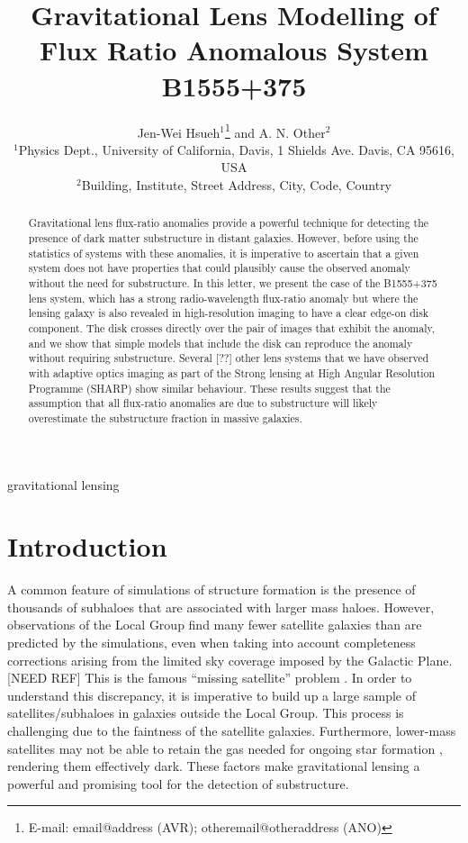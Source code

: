 \documentclass[useAMS,usenatbib]{mn2e}
\title[Beware the Effect of Edge-on Disks]{Gravitational Lens Modelling of Flux Ratio Anomalous System B1555+375}
\author[Hsueh et al.]{Jen-Wei Hsueh$^{1}$\thanks{E-mail:
email@address (AVR); otheremail@otheraddress (ANO)} and A. N.
Other$^{2}$\\
$^{1}$Physics Dept., University of California, Davis, 1 Shields Ave.
Davis, CA 95616, USA\\
$^{2}$Building, Institute, Street Address, City, Code, Country}
\begin{document}

\pagerange{\pageref{firstpage}--\pageref{lastpage}} 

\maketitle

\label{firstpage}

\begin{abstract}

Gravitational lens flux-ratio anomalies provide a powerful technique
for detecting the presence of dark matter substructure in distant
galaxies.  However, before using the statistics of systems with these
anomalies, it is imperative to ascertain that a given system does not
have properties that could plausibly cause the observed anomaly
without the need for substructure.  In this letter, we present the
case of the B1555+375 lens system, which has a strong radio-wavelength
flux-ratio anomaly but where the lensing galaxy is also revealed in
high-resolution imaging to have a clear edge-on disk component.  The
disk crosses directly over the pair of images that exhibit the
anomaly, and we show that simple models that include the disk can
reproduce the anomaly without requiring substructure.  Several [??]
other lens systems that we have observed with adaptive optics imaging
as part of the Strong lensing at High Angular Resolution Programme (SHARP)
show similar behaviour.  These results suggest that the assumption that
all flux-ratio anomalies are due to substructure will likely overestimate
the substructure fraction in massive galaxies.

\end{abstract}

\begin{keywords}
gravitational lensing
\end{keywords}

\section{Introduction}

A common feature of simulations of structure formation is the presence
of thousands of subhaloes that are associated with larger mass haloes.
However, observations of the Local Group find many fewer satellite
galaxies than are predicted by the simulations, even when taking into
account completeness corrections arising from the limited sky coverage
imposed by the Galactic Plane. [NEED REF]  This is the famous ``missing
satellite'' problem \citep{Klypin1999, Moore1999, S07}. In order to
understand this discrepancy, it is imperative to build up a large
sample of satellites/subhaloes in galaxies outside the Local Group.
This process is challenging due to the faintness of the satellite
galaxies.  Furthermore, lower-mass satellites may not be able to
retain the gas needed for ongoing star formation \citep[e.g.,][]{P11},
rendering them effectively dark.  These factors make gravitational
lensing a powerful and promising tool for the detection of
substructure.
\end{document}
